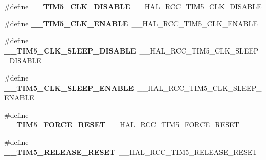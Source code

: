 \begin{DoxyCompactItemize}
\item 
\#define {\bfseries \+\_\+\+\_\+\+T\+I\+M5\+\_\+\+C\+L\+K\+\_\+\+D\+I\+S\+A\+B\+LE}~\+\_\+\+\_\+\+H\+A\+L\+\_\+\+R\+C\+C\+\_\+\+T\+I\+M5\+\_\+\+C\+L\+K\+\_\+\+D\+I\+S\+A\+B\+LE\hypertarget{group___h_a_l___r_c_c___aliased_ga182d511999875bd31812852b1b78f4e6}{}\label{group___h_a_l___r_c_c___aliased_ga182d511999875bd31812852b1b78f4e6}

\item 
\#define {\bfseries \+\_\+\+\_\+\+T\+I\+M5\+\_\+\+C\+L\+K\+\_\+\+E\+N\+A\+B\+LE}~\+\_\+\+\_\+\+H\+A\+L\+\_\+\+R\+C\+C\+\_\+\+T\+I\+M5\+\_\+\+C\+L\+K\+\_\+\+E\+N\+A\+B\+LE\hypertarget{group___h_a_l___r_c_c___aliased_ga88ce7393e694b7304832f859e79bbb45}{}\label{group___h_a_l___r_c_c___aliased_ga88ce7393e694b7304832f859e79bbb45}

\item 
\#define {\bfseries \+\_\+\+\_\+\+T\+I\+M5\+\_\+\+C\+L\+K\+\_\+\+S\+L\+E\+E\+P\+\_\+\+D\+I\+S\+A\+B\+LE}~\+\_\+\+\_\+\+H\+A\+L\+\_\+\+R\+C\+C\+\_\+\+T\+I\+M5\+\_\+\+C\+L\+K\+\_\+\+S\+L\+E\+E\+P\+\_\+\+D\+I\+S\+A\+B\+LE\hypertarget{group___h_a_l___r_c_c___aliased_ga6ef0270755ff81bb2bbdfabbe4565041}{}\label{group___h_a_l___r_c_c___aliased_ga6ef0270755ff81bb2bbdfabbe4565041}

\item 
\#define {\bfseries \+\_\+\+\_\+\+T\+I\+M5\+\_\+\+C\+L\+K\+\_\+\+S\+L\+E\+E\+P\+\_\+\+E\+N\+A\+B\+LE}~\+\_\+\+\_\+\+H\+A\+L\+\_\+\+R\+C\+C\+\_\+\+T\+I\+M5\+\_\+\+C\+L\+K\+\_\+\+S\+L\+E\+E\+P\+\_\+\+E\+N\+A\+B\+LE\hypertarget{group___h_a_l___r_c_c___aliased_gaa24fdb3b0088008c20c6e5ecccd3f6b6}{}\label{group___h_a_l___r_c_c___aliased_gaa24fdb3b0088008c20c6e5ecccd3f6b6}

\item 
\#define {\bfseries \+\_\+\+\_\+\+T\+I\+M5\+\_\+\+F\+O\+R\+C\+E\+\_\+\+R\+E\+S\+ET}~\+\_\+\+\_\+\+H\+A\+L\+\_\+\+R\+C\+C\+\_\+\+T\+I\+M5\+\_\+\+F\+O\+R\+C\+E\+\_\+\+R\+E\+S\+ET\hypertarget{group___h_a_l___r_c_c___aliased_gaa07976dd4fea46ea3607d60c91135d57}{}\label{group___h_a_l___r_c_c___aliased_gaa07976dd4fea46ea3607d60c91135d57}

\item 
\#define {\bfseries \+\_\+\+\_\+\+T\+I\+M5\+\_\+\+R\+E\+L\+E\+A\+S\+E\+\_\+\+R\+E\+S\+ET}~\+\_\+\+\_\+\+H\+A\+L\+\_\+\+R\+C\+C\+\_\+\+T\+I\+M5\+\_\+\+R\+E\+L\+E\+A\+S\+E\+\_\+\+R\+E\+S\+ET\hypertarget{group___h_a_l___r_c_c___aliased_ga9147d36f3775a32d40f0abcf2fd38fef}{}\label{group___h_a_l___r_c_c___aliased_ga9147d36f3775a32d40f0abcf2fd38fef}


\end{DoxyCompactItemize}
